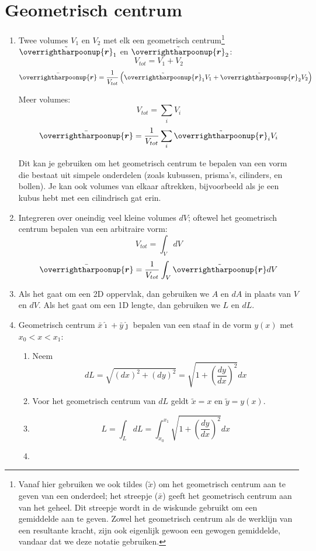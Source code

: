 \documentclass{article}
\renewcommand{\v}[1]{\overrightharpoonup{\bm{#1}}}
\renewcommand{\r}{\v{r}}
\renewcommand{\i}{\hat{\bm{\imath}}}
\renewcommand{\j}{\hat{\bm{\jmath}}}
\begin{document}
\section{Geometrisch centrum}

\begin{enumerate}
    \item Twee volumes $V_1$ en $V_2$ met elk een geometrisch centrum\footnote{Vanaf hier gebruiken we ook tildes ($\tilde{x}$) om het geometrisch centrum aan te geven van een onderdeel; het streepje ($\bar{x}$) geeft het geometrisch centrum aan van het geheel. Dit streepje wordt in de wiskunde gebruikt om een gemiddelde aan te geven. Zowel het geometrisch centrum als de werklijn van een resultante kracht, zijn ook eigenlijk gewoon een gewogen gemiddelde, vandaar dat we deze notatie gebruiken.} $\tilde{\r}_1$ en $\tilde{\r}_2$:
    $$V_{tot} = V_1 + V_2$$
$$\bar{\r} = \frac{1}{V_{tot}}\left(\tilde{\r}_1V_1 + \tilde{\r}_2V_2\right)$$

Meer volumes:
$$V_{tot} = \sum_i V_i$$
$$\bar{\r} = \frac{1}{V_{tot}}\sum_i \tilde{\r}_i V_i$$

Dit kan je gebruiken om het geometrisch centrum te bepalen van een vorm die bestaat uit simpele onderdelen (zoals kubussen, prisma's, cilinders, en bollen). Je kan ook volumes van elkaar aftrekken, bijvoorbeeld als je een kubus hebt met een cilindrisch gat erin.

\item Integreren over oneindig veel kleine volumes $dV$; oftewel het geometrisch centrum bepalen van een arbitraire vorm:
$$V_{tot} = \int_V dV$$
$$\bar{\r} = \frac{1}{V_{tot}}\int_V \tilde{\r} dV $$

\item Als het gaat om een 2D oppervlak, dan gebruiken we $A$ en $dA$ in plaats van $V$ en $dV$. Als het gaat om een 1D lengte, dan gebruiken we $L$ en $dL$.

\item Geometrisch centrum $\bar{x}\i+\bar{y}\j$ bepalen van een staaf in de vorm $y(x)$ met $x_0 < x < x_1$:
\begin{enumerate}
    \item Neem $$dL = \sqrt{(dx)^2+(dy)^2} = \sqrt{1+\left(\frac{dy}{dx}\right)^2} dx$$
    \item Voor het geometrisch centrum van $dL$ geldt $\tilde{x}= x$ en $\tilde{y} = y(x)$. 
    \item

    $$L = \int_L dL = \int_{x_0}^{x_1}\sqrt{1+\left(\frac{dy}{dx}\right)^2} dx$$
    \item
    

\end{enumerate}
\end{enumerate}
\end{document}
